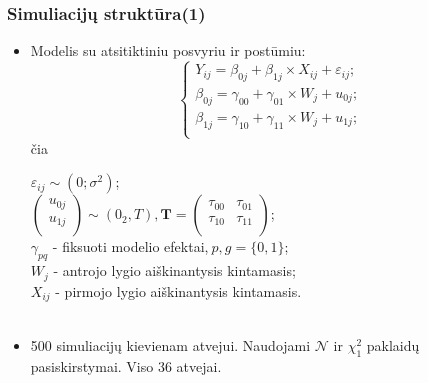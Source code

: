 \documentclass[utf8,hyperref={unicode,pdftex}]{beamer}
\begin{document}
\begin{frame}
\frametitle{Simuliacijų struktūra(1)}
\begin{itemize}
\item Modelis su atsitiktiniu posvyriu ir postūmiu:
\begin{equation*} \label{eq:2lvldelpish}
\left\{
\begin{array}{l}
Y_{ij} = \beta_{0j}+ \beta_{1j}\times X_{ij}+\varepsilon_{ij}; \\
\beta_{0j} = \gamma_{00} +\gamma_{01}\times W_{j}+u_{0j};\\
\beta_{1j} = \gamma_{10} +\gamma_{11}\times W_{j}+u_{1j};\\
\end{array} \right.
\end{equation*}
čia \\
\begin{small}
$\varepsilon_{ij}\sim \left(0;\sigma^2\right)$;\\
$\begin{pmatrix}
u_{0j} \\
u_{1j} \\
\end{pmatrix}\sim \left(0_2, T\right), \mathbf{T}=\begin{pmatrix}
\tau_{00} & \tau_{01} \\
\tau_{10} & \tau_{11} \\
\end{pmatrix}$; \\
$\gamma_{pq}$ - fiksuoti modelio efektai,$\ p,g = \{0,1\}$;\\
$W_j$ - antrojo lygio aiškinantysis kintamasis;\\
$X_{ij}$ - pirmojo lygio aiškinantysis kintamasis.\\ 
\ \\
\end{small}
\item 500 simuliacijų kievienam atvejui. Naudojami $\mathcal{N}$ ir $\chi^2_1$ paklaidų pasiskirstymai. Viso 36 atvejai.
\end{itemize}
\end{frame}
\end{document}
